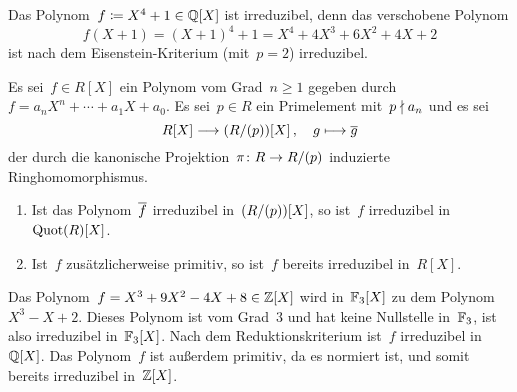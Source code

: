 \begin{example}
  Das Polynom~$f \coloneqq X^4 + 1 \in \mathbb{Q}[X]$ ist irreduzibel, denn das verschobene Polynom
  \[
    f(X+1)
    =
    (X + 1)^4 + 1
    =
    X^4 + 4 X^3 + 6 X^2 + 4 X + 2
  \]
  ist nach dem Eisenstein-Kriterium (mit~$p = 2$) irreduzibel.
\end{example}

\begin{proposition}[Reduktionskriterium]
  Es sei~$f \in R[X]$ ein Polynom vom Grad~$n \geq 1$ gegeben durch~$f = a_n X^n + \dotsb + a_1 X + a_0$.
  Es sei~$p \in R$ ein Primelement mit~$p \nmid a_n$ und es sei
  \[
    R[X]
    \to
    (R/\genideal{p})[X] \,,
    \quad
    g
    \mapsto
    \induced{g}
  \]
  der durch die kanonische Projektion~$\pi \colon R \to R / \genideal{p}$ induzierte Ringhomomorphismus.
  \begin{enumerate}
    \item
      Ist das Polynom~$\overline{f}$ irreduzibel in~$(R/(p))[X]$, so ist~$f$ irreduzibel in~$\operatorname{Quot}(R)[X]$.
    \item
      Ist~$f$ zusätzlicherweise primitiv, so ist~$f$ bereits irreduzibel in~$R[X]$.
  \end{enumerate}
\end{proposition}

\begin{example}
  Das Polynom~$f = X^3 + 9 X^2 - 4 X + 8 \in \mathbb{Z}[X]$ wird in~$\mathbb{F}_3[X]$ zu dem Polynom~$X^3 - X + 2$.
  Dieses Polynom ist vom Grad~$3$ und hat keine Nullstelle in~$\mathbb{F}_3$, ist also irreduzibel in~$\mathbb{F}_3[X]$.
  Nach dem Reduktionskriterium ist~$f$ irreduzibel in~$\mathbb{Q}[X]$.
  Das Polynom~$f$ ist außerdem primitiv, da es normiert ist, und somit bereits irreduzibel in~$\mathbb{Z}[X]$.
\end{example}





